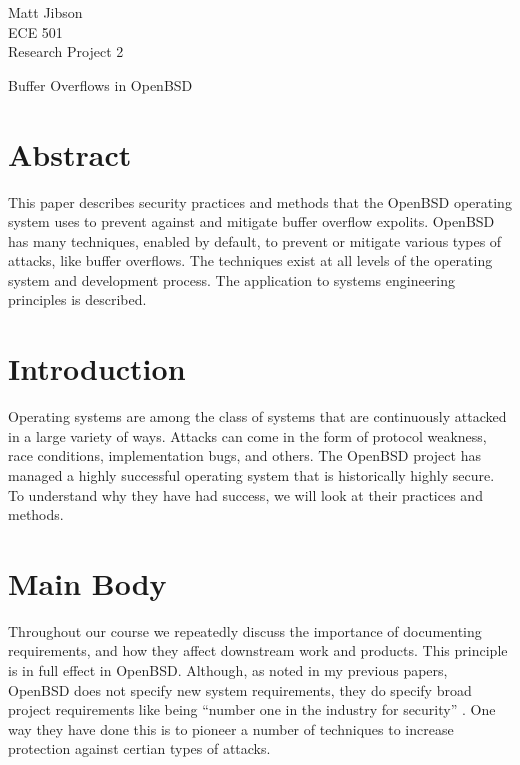 \documentclass[12pt]{article}
\begin{document}
\begin{flushright}
Matt Jibson \\
ECE 501 \\
Research Project 2
\end{flushright}

\begin{center}
\Large Buffer Overflows in OpenBSD
\end{center}

{\setlength{\baselineskip}{1.6\baselineskip}

\section*{Abstract}

This paper describes security practices and methods that the OpenBSD operating system uses to prevent against and mitigate buffer overflow expolits. OpenBSD has many techniques, enabled by default, to prevent or mitigate various types of attacks, like buffer overflows. The techniques exist at all levels of the operating system and development process. The application to systems engineering principles is described.

\section*{Introduction}

Operating systems are among the class of systems that are continuously attacked in a large variety of ways. Attacks can come in the form of protocol weakness, race conditions, implementation bugs, and others. The OpenBSD project has managed a highly successful operating system that is historically highly secure. To understand why they have had success, we will look at their practices and methods.

\section*{Main Body}

Throughout our course we repeatedly discuss the importance of documenting requirements, and how they affect downstream work and products. This principle is in full effect in OpenBSD. Although, as noted in my previous papers, OpenBSD does not specify new system requirements, they do specify broad project requirements like being ``number one in the industry for security'' \cite{security}. One way they have done this is to pioneer a number of techniques to increase protection against certian types of attacks.

}
\end{document}
